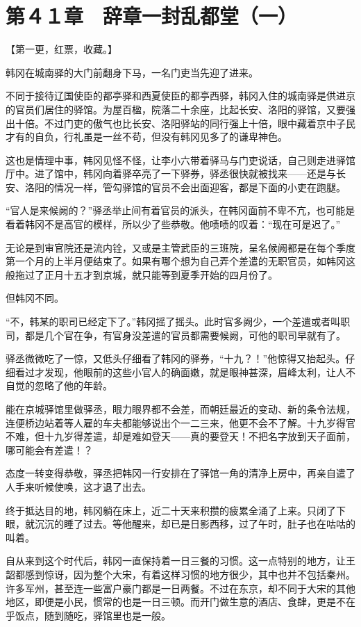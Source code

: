 \section{第４１章　辞章一封乱都堂（一）}

【第一更，红票，收藏。】

韩冈在城南驿的大门前翻身下马，一名门吏当先迎了进来。

不同于接待辽国使臣的都亭驿和西夏使臣的都亭西驿，韩冈入住的城南驿是供进京的官员们居住的驿馆。为屋百楹，院落二十余座，比起长安、洛阳的驿馆，又要强出十倍。不过门吏的傲气也比长安、洛阳驿站的同行强上十倍，眼中藏着京中子民才有的自负，行礼虽是一丝不苟，但没有韩冈见多了的谦卑神色。

这也是情理中事，韩冈见怪不怪，让李小六带着驿马与门吏说话，自己则走进驿馆厅中。进了馆中，韩冈向着驿卒亮了一下驿券，驿丞很快就被找来——还是与长安、洛阳的情况一样，管勾驿馆的官员不会出面迎客，都是下面的小吏在跑腿。

“官人是来候阙的？”驿丞举止间有着官员的派头，在韩冈面前不卑不亢，也可能是看着韩冈不是高官的模样，所以少了些恭敬。他啧啧的叹着：“现在可是迟了。”

无论是到审官院还是流内铨，又或是主管武臣的三班院，呈名候阙都是在每个季度第一个月的上半月便结束了。如果有哪个想为自己弄个差遣的无职官员，如韩冈这般拖过了正月十五才到京城，就只能等到夏季开始的四月份了。

但韩冈不同。

“不，韩某的职司已经定下了。”韩冈摇了摇头。此时官多阙少，一个差遣或者叫职司，都是几个官在争，有官身没差遣的官员都需要候阙，可他的职司早就有了。

驿丞微微吃了一惊，又低头仔细看了韩冈的驿券，“十九？！”他惊得又抬起头。仔细看过才发现，他眼前的这些小官人的确面嫩，就是眼神甚深，眉峰太利，让人不自觉的忽略了他的年龄。

能在京城驿馆里做驿丞，眼力眼界都不会差，而朝廷最近的变动、新的条令法规，连便桥边站着等人雇的车夫都能够说出个一二三来，他更不会不了解。十九岁得官不难，但十九岁得差遣，却是难如登天——真的要登天！不把名字放到天子面前，哪可能会有差遣！？

态度一转变得恭敬，驿丞把韩冈一行安排在了驿馆一角的清净上房中，再亲自遣了人手来听候使唤，这才退了出去。

终于抵达目的地，韩冈躺在床上，近二十天来积攒的疲累全涌了上来。只闭了下眼，就沉沉的睡了过去。等他醒来，却已是日影西移，过了午时，肚子也在咕咕的叫着。

自从来到这个时代后，韩冈一直保持着一日三餐的习惯。这一点特别的地方，让王韶都感到惊讶，因为整个大宋，有着这样习惯的地方很少，其中也并不包括秦州。许多军州，甚至连一些富户豪门都是一日两餐。不过在东京，却不同于大宋的其他地区，即便是小民，惯常的也是一日三顿。而开门做生意的酒店、食肆，更是不在乎饭点，随到随吃，驿馆里也是一般。

